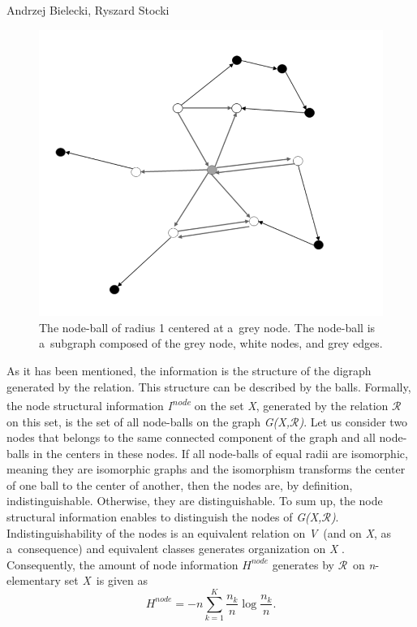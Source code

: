 \begin{artengenv2auth}{Andrzej Bielecki, Ryszard Stocki}
\begin{figure}
 \begin{center}
 \includegraphics[width=.99\textwidth]{ART_Bielecki/InfoStructcorrectedcopyeditedPP-img001-bw.png}%
 \end{center}%
 \caption{The node-ball of radius 1 centered at a~grey node. The node-ball is a~subgraph composed of the grey node, white nodes, and grey edges.}\label{bie:fig1}
\end{figure}





As it has been mentioned, the information is the structure of the digraph generated by the relation. This structure can be described by the balls. Formally, the node structural information \textit{I}\textit{\textsuperscript{node}} on the set \textit{X}, generated by the relation $\mathcal{R}$ on this set, is the set of all node-balls on the graph \textit{G(X,$\mathcal{R}$)}. Let us consider two nodes that belongs to the same connected component of the graph and all node-balls in the centers in these nodes. If all node-balls of equal radii are isomorphic, meaning they are isomorphic graphs and the isomorphism transforms the center of one ball to the center of another, then the nodes are, by definition, indistinguishable. Otherwise, they are distinguishable. To sum up, the node structural information enables to distinguish the nodes of \textit{G(X,$\mathcal{R}$)}. Indistinguishability of the nodes is an equivalent relation on \textit{V}~(and on \textit{X}, as a~consequence) and equivalent classes generates organization on \textit{X} 
\parencite[see][]{hellerman_representation_2006}. %
 Consequently, the amount of node information $H^{\textit{node}}$ generates by $\mathcal{R}$~on \textit{n}{}-elementary set \textit{X}~is given as
\begingroup
\reqnos
\begin{equation}
H^{\textit{node}}=-n\sum _{k=1}^K\frac{n_k} n\log \frac{n_k} n.
\end{equation}
\endgroup





\end{artengenv2auth}
